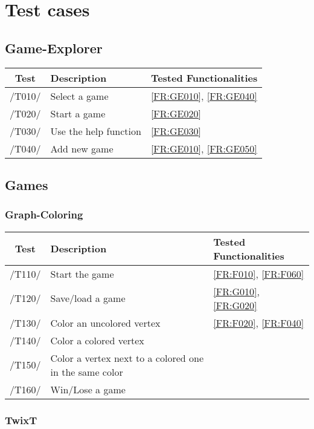 \section{Test cases}

\subsection{Game-Explorer}

\begin{tabular}{cll}

\hline
\textbf{Test} & \textbf{Description} & \textbf{Tested Functionalities} \\
\hline
/T010/ & Select a game & \ref{FR:GE010}, \ref{FR:GE040} \\
/T020/ & Start a game & \ref{FR:GE020} \\
/T030/ & Use the help function & \ref{FR:GE030} \\
/T040/ & Add new game & \ref{FR:GE010}, \ref{FR:GE050} \\
\hline

\end{tabular}

\subsection{Games}

\subsubsection{Graph-Coloring}

\begin{tabular}{cll}

\hline
\textbf{Test} & \textbf{Description} & \textbf{Tested Functionalities} \\
\hline
/T110/ & Start the game & \ref{FR:F010}, \ref{FR:F060} \\
/T120/ & Save/load a game & \ref{FR:G010}, \ref{FR:G020}\\
/T130/ & Color an uncolored vertex & \ref{FR:F020}, \ref{FR:F040}\\
/T140/ & Color a colored vertex & \\
/T150/ & Color a vertex next to a colored one in the same color & \\
/T160/ & Win/Lose a game & \\
\hline

\end{tabular}

\subsubsection{TwixT}

